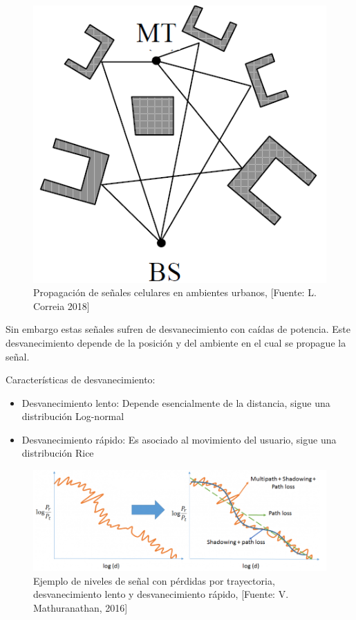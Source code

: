 \begin{figure}[th]
\centering
\includegraphics[scale=.5]{Figures/Propagación de señales celulares en ambientes urbanos.}
\decoRule
\caption[Propagación de señales celulares en ambientes urbanos]{Propagación de señales celulares en ambientes urbanos, [Fuente: L. Correia 2018]}
\label{fig:Propagacion}
\end{figure}

Sin embargo estas señales sufren de desvanecimiento con caídas de potencia. Este desvanecimiento depende de la posición y del ambiente en el cual se propague la señal.\newline

Características de desvanecimiento:
\begin{itemize}
    \item Desvanecimiento lento:
    Depende esencialmente de la distancia, sigue una distribución Log-normal
    \item Desvanecimiento rápido:
    Es asociado al movimiento del usuario, sigue una distribución Rice
\end{itemize}

\begin{figure}[th]
\centering
\includegraphics[scale=.8]{Figures/Ejemplo de niveles de señal con desvanecimiento lento y desvanecimiento rápido}
\decoRule
\caption[Ejemplo de niveles de señal con pérdidas por trayectoria, desvanecimiento lento y desvanecimiento rápido]{Ejemplo de niveles de señal con pérdidas por trayectoria, desvanecimiento lento y desvanecimiento rápido, [Fuente: V. Mathuranathan, 2016]}
\label{fig:Desvanecimientos}
\end{figure}

